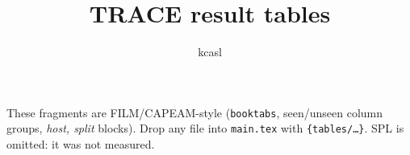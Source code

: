 \documentclass[conference]{IEEEtran}
\begin{document}
\title{TRACE result tables}
\author{kcasl}
\maketitle

These fragments are FILM/CAPEAM-style (\texttt{booktabs}, seen/unseen column groups, \textit{host, split} blocks).
Drop any file into \texttt{main.tex} with \texttt{\string\{tables/\ldots\}}.
SPL is omitted: it was not measured.















\end{document}
